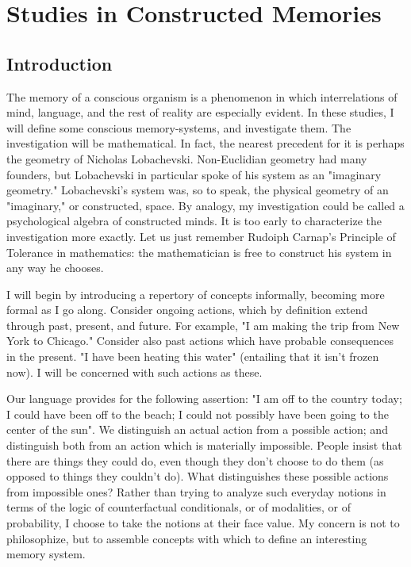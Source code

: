 \chapter{Studies in Constructed Memories}

\section{Introduction}

The memory of a conscious organism is a phenomenon in which 
interrelations of mind, language, and the rest of reality are especially evident. 
In these studies, I will define some conscious memory-systems, and 
investigate them. The investigation will be mathematical. In fact, the nearest 
precedent for it is perhaps the geometry of Nicholas Lobachevski. 
Non-Euclidian geometry had many founders, but Lobachevski in particular 
spoke of his system as an "imaginary geometry." Lobachevski's system was, 
so to speak, the physical geometry of an "imaginary," or constructed, space. 
By analogy, my investigation could be called a psychological algebra of 
constructed minds. It is too early to characterize the investigation more 
exactly. Let us just remember Rudoiph Carnap's Principle of Tolerance in 
mathematics: the mathematician is free to construct his system in any way 
he chooses. 

I will begin by introducing a repertory of concepts informally, 
becoming more formal as I go along. Consider ongoing actions, which by 
definition extend through past, present, and future. For example, "I am 
making the trip from New York to Chicago." Consider also past actions 
which have probable consequences in the present. "I have been heating this 
water" (entailing that it isn't frozen now). I will be concerned with such 
actions as these. 

Our language provides for the following assertion: "I am off to the 
country today; I could have been off to the beach; I could not possibly have 
been going to the center of the sun". We distinguish an actual action from a 
possible action; and distinguish both from an action which is materially 
impossible. People insist that there are things they could do, even though 
they don't choose to do them (as opposed to things they couldn't do). What 
distinguishes these possible actions from impossible ones? Rather than 
trying to analyze such everyday notions in terms of the logic of 
counterfactual conditionals, or of modalities, or of probability, I choose to 
take the notions at their face value. My concern is not to philosophize, but 
to assemble concepts with which to define an interesting memory system. 

